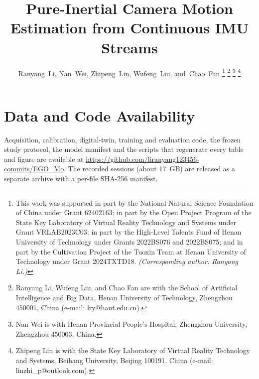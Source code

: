 \documentclass[journal]{IEEEtran}
\begin{document}
\title{Pure-Inertial Camera Motion Estimation from Continuous IMU Streams}

\author{Ranyang~Li,
        Nan~Wei,
        Zhipeng~Lin,
        Wufeng~Liu,
        and~Chao~Fan
\thanks{This work was supported in part by the National Natural Science
Foundation of China under Grant 62402163;  in part by the Open
Project Program of the State Key Laboratory of Virtual Reality Technology and
Systems under Grant VRLAB2023C03; in part by the High-Level Talents Fund of
Henan University of Technology under Grants 2022BS076 and 2022BS075; and in
part by the Cultivation Project of the Tuoxin Team at Henan University of
Technology under Grant 2024TXTD18. \emph{(Corresponding author: Ranyang Li.)}}
\thanks{Ranyang Li, Wufeng Liu, and Chao Fan are with the School of
Artificial Intelligence and Big Data, Henan University of Technology,
Zhengzhou 450001, China (e-mail: lry@haut.edu.cn).}
\thanks{Nan Wei is with Henan Provincial People's Hospital, Zhengzhou
University, Zhengzhou 450003, China.}
\thanks{Zhipeng Lin is with the State Key Laboratory of Virtual Reality
Technology and Systems, Beihang University, Beijing 100191, China (e-mail:
linzhi\_p@outlook.com).}
}


\maketitle















\section*{Data and Code Availability}
Acquisition, calibration, digital-twin, training and evaluation code, the
frozen study protocol, the model manifest and the scripts that regenerate
every table and figure are available at
\url{https://github.com/liranyang123456-commits/EGO_Mo}. The recorded
sessions (about 17~GB) are released as a separate archive with a per-file
SHA-256 manifest.




\end{document}
